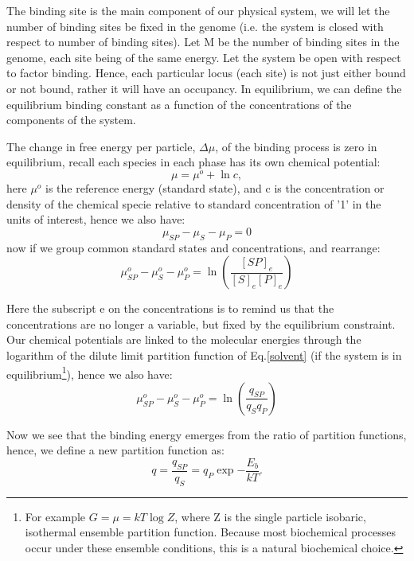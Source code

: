 The binding site is the main component of our physical system, we will let the number of binding sites be fixed in the genome (i.e. the system is closed with respect to number of binding sites).  Let M be the number of binding sites in the genome, each site being of the same energy.  Let the system be open with respect to factor binding. Hence, each particular locus (each site) is not just either bound or not bound, rather it will have an occupancy.  In equilibrium, we can define the equilibrium binding constant as a function of the concentrations of the components of the system.

The change in free energy per particle, $\Delta \mu$, of the binding process is zero in equilibrium, recall each species in each phase has its own chemical potential:
\begin{equation}\label{chemc}
 \mu = \mu^o + \ln{c},
 \end{equation}
  here $\mu^o$ is the reference energy (standard state), and c is the concentration or density of the chemical specie relative to standard concentration of '1' in the units of interest, hence we also have:
\begin{equation}
 \mu_{SP} - \mu_S - \mu_P   = 0
\end{equation}
now if we group common standard states and concentrations, and rearrange:
\begin{equation}\label{}
  \mu_{SP}^o - \mu_S^o - \mu_P^o = \ln( \frac{ [SP]_e }{[S]_e [P]_e} )
\end{equation}


Here the subscript e on the concentrations is to remind us that the concentrations are no longer a variable, but fixed by the equilibrium constraint.  Our chemical potentials are linked to the molecular energies through the logarithm of the dilute limit partition function of Eq.\ref{solvent} (if the system is in equilibrium\footnote{ For example $G = \mu = kT \log Z$, where Z is the single particle isobaric, isothermal ensemble partition function.  Because most biochemical processes occur under these ensemble conditions, this is a natural biochemical choice.}), hence we also have:
\begin{equation}\label{}
  \mu_{SP}^o - \mu_S^o - \mu_P^o = \ln( \frac{ q_{SP} } { q_S q_P })
\end{equation}

Now we see that the binding energy emerges from the ratio of partition functions, hence, we define a new partition function as:
\begin{equation}\label{}
  q = \frac{ q_{SP} } { q_S } = q_{P} \exp{-\frac{E_b}{kT} }.
\end{equation}


